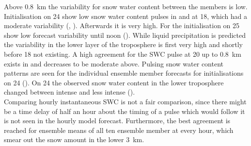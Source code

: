 Above \SI{0.8}{\km} the variability for snow water content between the members is low. Initialisation on \SI{24}{\dec} show low snow water content pulses in  and  at \SI{18}{\UTC}, which had a moderate variability (, ). Afterwards it is very high. For the initialisation on \SI{25}{\dec} show low forecast variability until noon (). While liquid precipitation is predicted the variability in the lower layer of the troposphere is first very high and shortly before \SI{18}{\UTC} not existing. A high agreement for the SWC pulse at \SI{20}{\UTC} up to \SI{0.8}{\km} exists in  and decreases to be moderate above.
Pulsing snow water content patterns are seen for the individual ensemble member forecasts for initialisations on \SI{24}{\dec} (). On \SI{24}{\dec} the observed snow water content in the lower troposphere changed between intense and less intense ().
\\
Comparing hourly instantaneous SWC is not a fair comparison, since there might be a time delay of half an hour about the timing of a pulse which would follow it is not seen in the hourly model forecast. Furthermore, the best agreement is reached for ensemble means of all ten ensemble member at every hour, which smear out the snow amount in the lower \SI{3}{\km}.
\\
\\

